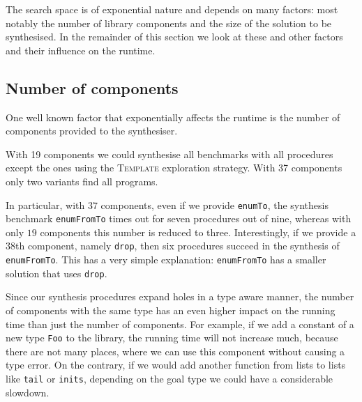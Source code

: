 The search space is of exponential nature and depends on many factors: most notably the number of library components and the size of the solution to be synthesised. In the remainder of this section we look at these and other factors and their influence on the runtime.

\subsection{Number of components}
One well known factor that exponentially affects the runtime is the number of components provided to the synthesiser.

With 19 components we could synthesise all benchmarks with all procedures except the ones using the \textsc{Template} exploration strategy. With 37 components only two variants find all programs.

In particular, with $37$ components, even if we provide \lstinline?enumTo?, the synthesis benchmark \lstinline?enumFromTo? times out for seven procedures out of nine, whereas with only $19$ components this number is reduced to three.
Interestingly, if we provide a $38$th component, namely \lstinline?drop?, then six procedures succeed in the synthesis of \lstinline?enumFromTo?. This has a very simple explanation: \lstinline?enumFromTo? has a smaller solution that uses \lstinline?drop?.

Since our synthesis procedures expand holes in a type aware manner, the number of components with the same type has an even higher impact on the running time than just the number of components. For example, if we add a constant of a new type \lstinline?Foo? to the library, the running time will not increase much, because there are not many places, where we can use this component without causing a type error. On the contrary, if we would add another function from lists to lists like \lstinline?tail? or \lstinline?inits?, depending on the goal type we could have a considerable slowdown. 

